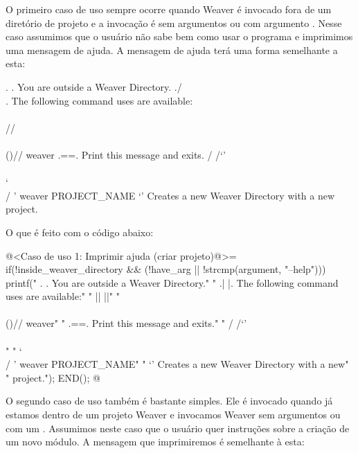 {

O primeiro caso de uso sempre ocorre quando Weaver é invocado fora de
um diretório de projeto e a invocação é sem argumentos ou com
argumento . Nesse caso assumimos que o usuário não sabe
bem como usar o programa e imprimimos uma mensagem de ajuda. A mensagem
de ajuda terá uma forma semelhante a esta:

\alinhaverbatim
    .  .   You are outside a Weaver Directory.
   ./  \\.  The following command uses are available:
   \\\\  //
   \\\\()//  weaver
   .={}=.      Print this message and exits.
  / /`'\\ \\
  ` \\  / '  weaver PROJECT_NAME
     `'        Creates a new Weaver Directory with a new
               project.
\alinhanormal

O que é feito com o código abaixo:


\iniciocodigo
@<Caso de uso 1: Imprimir ajuda (criar projeto)@>=
if(!inside_weaver_directory && (!have_arg || !strcmp(argument, "--help"))){
  printf("    .  .     You are outside a Weaver Directory.\n"
  "   .|  |.    The following command uses are available:\n"
  "   ||  ||\n"
  "   \\\\()//  weaver\n"
  "   .={}=.      Print this message and exits.\n"
  "  / /`'\\ \\\n"
  "  ` \\  / '  weaver PROJECT_NAME\n"
  "     `'        Creates a new Weaver Directory with a new\n"
  "               project.\n");
  END();
}
@
\fimcodigo



O segundo caso de uso também é bastante simples. Ele é invocado quando
já estamos dentro de um projeto Weaver e invocamos Weaver sem
argumentos ou com um . Assumimos neste caso que o
usuário quer instruções sobre a criação de um novo módulo. A mensagem
que imprimiremos é semelhante à esta:

}

